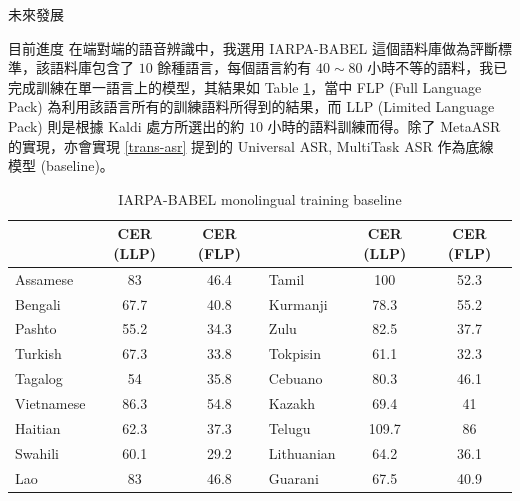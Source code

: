 \documentclass[12pt,UTF8,fntef]{article}
\begin{document}
\begin{section}{未來發展}
  \begin{subsection}{目前進度} \label{progress}
    在端對端的語音辨識中，我選用 IARPA-BABEL 這個語料庫做為評斷標準，該語料庫包含了 $10$ 餘種語言，每個語言約有 $40 \sim 80$ 小時不等的語料，我已完成訓練在單一語言上的模型，其結果如 Table \ref{table:monoASR}，當中 FLP (Full Language Pack) 為利用該語言所有的訓練語料所得到的結果，而 LLP (Limited Language Pack) 則是根據 Kaldi 處方所選出的約 $10$ 小時的語料訓練而得。除了 MetaASR 的實現，亦會實現 \ref{trans-asr} 提到的 Universal ASR, MultiTask ASR 作為底線 模型 (baseline)。

\begin{table}[ht]
  \centering
\begin{tabular}{l|c|c|l|c|c|}
\cline{2-3} \cline{5-6}
\multicolumn{1}{c|}{}            & CER (LLP) & CER (FLP) & \multicolumn{1}{c|}{} & CER (LLP) & CER (FLP) \\ \hline
\multicolumn{1}{|l|}{Assamese}   & 83        & 46.4      & Tamil                 & 100       & 52.3      \\ \hline
\multicolumn{1}{|l|}{Bengali}    & 67.7      & 40.8      & Kurmanji              & 78.3      & 55.2      \\ \hline
\multicolumn{1}{|l|}{Pashto}     & 55.2      & 34.3      & Zulu                  & 82.5      & 37.7      \\ \hline
\multicolumn{1}{|l|}{Turkish}    & 67.3      & 33.8      & Tokpisin              & 61.1      & 32.3      \\ \hline
\multicolumn{1}{|l|}{Tagalog}    & 54        & 35.8      & Cebuano               & 80.3      & 46.1      \\ \hline
\multicolumn{1}{|l|}{Vietnamese} & 86.3      & 54.8      & Kazakh                & 69.4      & 41        \\ \hline
\multicolumn{1}{|l|}{Haitian}    & 62.3      & 37.3      & Telugu                & 109.7     & 86        \\ \hline
\multicolumn{1}{|l|}{Swahili}    & 60.1      & 29.2      & Lithuanian            & 64.2      & 36.1      \\ \hline
\multicolumn{1}{|l|}{Lao}        & 83        & 46.8      & Guarani               & 67.5      & 40.9      \\ \hline
\end{tabular}
\caption{IARPA-BABEL monolingual training baseline}
\label{table:monoASR}
\end{table}
  \end{subsection}


\end{section}
\end{document}
